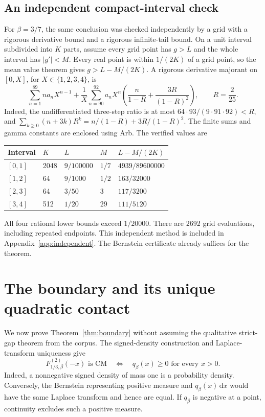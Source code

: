 \documentclass[11pt,a4paper]{article}
\numberwithin{equation}{section}
\theoremstyle{definition}\newtheorem{definition}[theorem]{Definition}
\theoremstyle{remark}\newtheorem{remark}[theorem]{Remark}
\newcommand{\dd}{\,\mathrm d}
\begin{document}
\subsection{An independent compact-interval check}

For \(\beta=3/7\), the same conclusion was checked independently by
a grid with a rigorous derivative bound and a rigorous infinite-tail
bound. On a unit interval subdivided into \(K\) parts, assume every
grid point has \(g>L\) and the whole interval has \(|g'|<M\).
Every real point is within \(1/(2K)\) of a grid point, so the mean
value theorem gives \(g>L-M/(2K)\). A rigorous derivative majorant
on \([0,X]\), for \(X\in\{1,2,3,4\}\), is
\[
 \sum_{n=1}^{89}n a_nX^{n-1}
 +\frac1X\sum_{n=90}^{92}a_nX^n
 \left(\frac{n}{1-R}+\frac{3R}{(1-R)^2}\right),
 \qquad R=\frac2{25}.
\]
Indeed, the undifferentiated three-step ratio is at most
\(64\cdot93/(9\cdot91\cdot92)<R\), and
\(\sum_{k\ge0}(n+3k)R^k=n/(1-R)+3R/(1-R)^2\).
The finite sums and gamma constants are enclosed using Arb. The
verified values are
\begin{center}\small
\begin{tabular}{@{}lllll@{}}
\toprule
Interval & \(K\) & \(L\) & \(M\) & \(L-M/(2K)\)\\
\midrule
\([0,1]\)&2048&\(9/100000\)&\(1/7\)&\(4939/89600000\)\\
\([1,2]\)&64&\(9/1000\)&\(1/2\)&\(163/32000\)\\
\([2,3]\)&64&\(3/50\)&\(3\)&\(117/3200\)\\
\([3,4]\)&512&\(1/20\)&\(29\)&\(111/5120\)\\
\bottomrule
\end{tabular}
\end{center}
All four rational lower bounds exceed \(1/20000\). There are 2692
grid evaluations, including repeated endpoints. This independent
method is included in Appendix~\ref{app:independent}. The Bernstein
certificate already suffices for the theorem.

\section{The boundary and its unique quadratic contact}
\label{sec:boundary}

We now prove Theorem~\ref{thm:boundary} without assuming the
qualitative strict-gap theorem from the corpus. The signed-density
construction and Laplace-transform uniqueness give
\begin{equation}\label{eq:CM-positive}
 F_{1/3,\beta}^{(2)}(-x)\text{ is CM}
 \quad\Longleftrightarrow\quad q_\beta(x)\ge0
 \text{ for every }x>0.
\end{equation}
Indeed, a nonnegative signed density of mass one is a probability
density. Conversely, the Bernstein representing positive measure and
\(q_\beta(x)\dd x\) would have the same Laplace transform and hence
are equal. If \(q_\beta\) is negative at a point, continuity excludes
such a positive measure.
\end{document}
